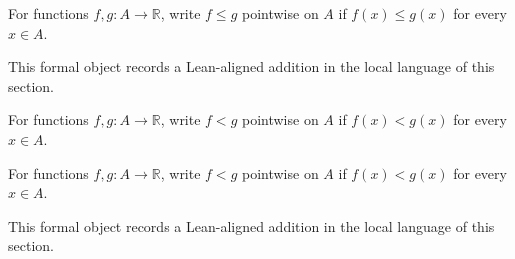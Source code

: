 \begin{remark*}
For functions $f,g:A\to\mathbb R$, write $f\le g$ pointwise on $A$ if $f(x)\le g(x)$ for every $x\in A$.
\end{remark*}

\begin{remark*}[Interpretation]
This formal object records a Lean-aligned addition in the local language of this section.
\end{remark*}

\begin{dependencies}
\NoLocalDependencies
\end{dependencies}
\begin{definition}
\label{def:pointwise-lt}
For functions $f,g:A\to\mathbb R$, write $f<g$ pointwise on $A$ if $f(x)<g(x)$ for every $x\in A$.
\end{definition}

\begin{remark*}
For functions $f,g:A\to\mathbb R$, write $f<g$ pointwise on $A$ if $f(x)<g(x)$ for every $x\in A$.
\end{remark*}

\begin{remark*}[Interpretation]
This formal object records a Lean-aligned addition in the local language of this section.
\end{remark*}

\begin{dependencies}
\NoLocalDependencies
\end{dependencies}
